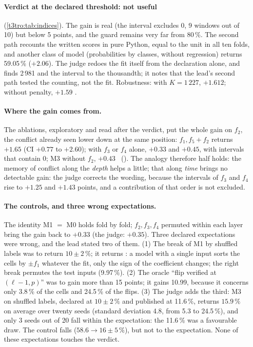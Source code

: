 \paragraph{Verdict at the declared threshold: not useful} (\cref{t3tro:tab:indices}). The gain is real (the interval excludes 0, 9 windows out of 10) but below 5 points, and the guard remains very far from 80\,\%. The second path recounts the written scores in pure Python, equal to the unit in all ten folds, and another class of model (probabilities by classes, without regression) returns 59.05\,\% ($+2.06$). The judge redoes the fit itself from the declaration alone, and finds 2\,981 and the interval to the thousandth; it notes that the lead's second path tested the counting, not the fit. Robustness: with $K = 1\,227$, $+1.612$; without penalty, $+1.59$ \mes.

\paragraph{Where the gain comes from.} The ablations, exploratory and read after the verdict, put the whole gain on $f_2$, the conflict already seen lower down at the same position: $f_1, f_5 + f_2$ returns $+1.65$ (CI $+0.77$ to $+2.60$); with $f_3$ or $f_4$ alone, $+0.33$ and $+0.45$, with intervals that contain 0; M3 without $f_2$, $+0.43$ \mes~(). The analogy therefore half holds: the memory of conflict along the \emph{depth} helps a little; that along \emph{time} brings  no detectable gain: the judge corrects the wording, because the intervals of $f_3$ and $f_4$ rise to $+1.25$ and $+1.43$ points, and a contribution of that order is not excluded.

\paragraph{The controls, and three wrong expectations.} The identity M1 $=$ M0 holds fold by fold; $f_2, f_3, f_4$ permuted within each layer bring the gain back to $+0.33$ (the judge: $+0.35$). Three declared expectations were wrong, and the lead stated two of them. (1) The break of M1 by shuffled labels was to return $10 \pm 2\,\%$; it returns : a model with a single input sorts the cells by $\pm f_1$ whatever the fit, only the sign of the coefficient changes; the right break permutes the test inputs (9.97\,\%). (2) The oracle ``flip verified at $(\ell - 1, p)$'' was to gain more than 15 points; it gains 10.99, because it concerns only 3.8\,\% of the cells and 24.5\,\% of the flips. (3) The judge adds the third: M3 on shuffled labels, declared at $10 \pm 2\,\%$ and published at 11.6\,\%, returns $15.9\,\%$ on average over twenty seeds (standard deviation 4.8, from 5.3 to 24.5\,\%), and only 3 seeds out of 20 fall within the expectation: the 11.6\,\% was a favourable draw. The control falls ($58.6 \to 16 \pm 5\,\%$), but not to the expectation. None of these expectations touches the verdict.

